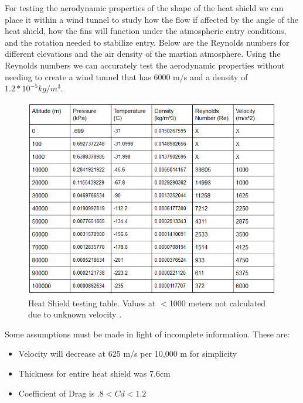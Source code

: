 \documentclass[%
 portrait,
 aapm,
 mph,%
 amsmath,amssymb,
 reprint,%
]{revtex4-2}
\begin{document}
For testing the aerodynamic properties of the shape of the heat shield we can place it within a wind tunnel to study how the flow if affected by the angle of the heat shield, how the fins will function under the atmospheric entry conditions, and the rotation needed to stabilize entry.  Below are the Reynolds numbers for different elevations and the air density of the martian atmosphere.  Using the Reynolds numbers we can accurately test the aerodynamic properties without needing to create a wind tunnel that has 6000 m/s and a density of \begin{math} 1.2*10^{-5}  kg/m^3 \end{math}.
\begin{figure}
  \includegraphics[width=\textwidth]{DescentandLanding/4_4_1_HeatShield.png}
   \caption{Heat Shield testing table. Values at \begin{math}<\end{math}1000 meters not calculated due to unknown velocity \cite{wiki:003, NASA, wiki:005}.}
\end{figure} 
Some assumptions must be made in light of incomplete information. These are: 
\begin{itemize}
    \item Velocity will decrease at 625 m/s per 10,000 m for simplicity
    \item Thickness for entire heat shield was 7.6cm
    \item Coefficient of Drag is \begin{math} .8 < Cd < 1.2 \end{math}
\end{itemize}
\end{document}
